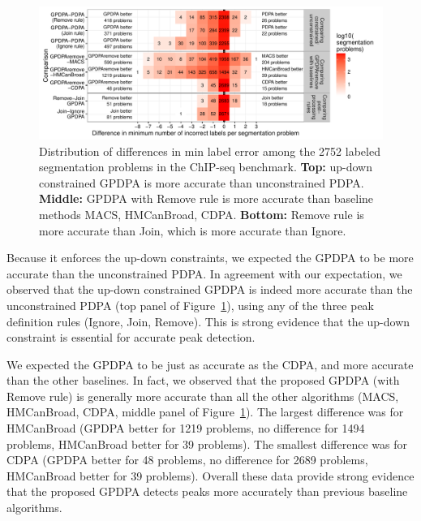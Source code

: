 \documentclass[twoside,11pt]{article}
\begin{document}
\begin{figure}
  \centering
  \includegraphics[width=\textwidth]{figure-PDPA-infeasible-error-compare}
  \vspace{-1cm}
  \caption{Distribution of differences in min label error among the
    2752 labeled segmentation problems in the ChIP-seq benchmark. 
    \textbf{Top:} up-down constrained GPDPA is more accurate than
    unconstrained PDPA. \textbf{Middle:} GPDPA with Remove
    rule is more accurate than baseline methods MACS, HMCanBroad,
    CDPA. \textbf{Bottom:} Remove rule is more accurate than 
    Join, which is more accurate than Ignore.}
  \label{fig:PDPA-infeasible-error-compare}
\end{figure} 



Because it enforces the up-down constraints, we expected the GPDPA to
be more accurate than the unconstrained PDPA. In agreement with our
expectation, we observed that the up-down constrained GPDPA is indeed
more accurate than the unconstrained PDPA (top panel of
Figure~\ref{fig:PDPA-infeasible-error-compare}), using
any of the three peak definition rules (Ignore, Join, Remove). This is
strong evidence that the up-down constraint is essential for accurate
peak detection.

We expected the GPDPA to be just as accurate as the CDPA, and more
accurate than the other baselines. In fact, we observed that the
proposed GPDPA (with Remove rule) is generally more accurate than all
the other algorithms (MACS, HMCanBroad, CDPA, middle panel of
Figure~\ref{fig:PDPA-infeasible-error-compare}). The largest
difference was for HMCanBroad (GPDPA better for 1219 problems, no
difference for 1494 problems, HMCanBroad better for 39 problems). The
smallest difference was for CDPA (GPDPA better for 48 problems, no
difference for 2689 problems, HMCanBroad better for 39 problems). Overall these data provide strong evidence that the proposed GPDPA detects peaks more
accurately than previous baseline algorithms.
\end{document}
